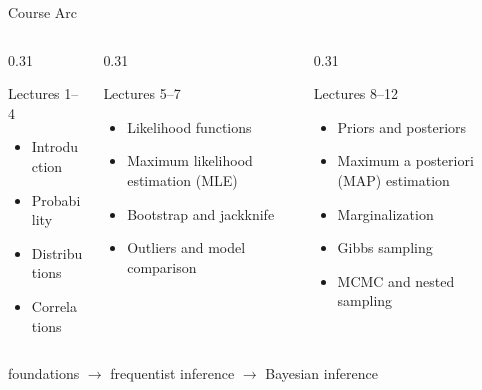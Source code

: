 \documentclass[aspectratio=169,11pt]{beamer}
\begin{document}
\begin{frame}{Course Arc}
  \begin{columns}[T,totalwidth=\textwidth]
    \begin{column}{0.31\textwidth}
      \begin{block}{Lectures 1--4}
        \begin{itemize}
          \item Introduction
          \item Probability
          \item Distributions
          \item Correlations
        \end{itemize}
      \end{block}
    \end{column}
    \begin{column}{0.31\textwidth}
      \begin{block}{Lectures 5--7}
        \begin{itemize}
          \item Likelihood functions
          \item Maximum likelihood estimation (MLE)
          \item Bootstrap and jackknife
          \item Outliers and model comparison
        \end{itemize}
      \end{block}
    \end{column}
    \begin{column}{0.31\textwidth}
      \begin{block}{Lectures 8--12}
        \begin{itemize}
          \item Priors and posteriors
          \item Maximum a posteriori (MAP) estimation
          \item Marginalization
          \item Gibbs sampling
          \item MCMC and nested sampling
        \end{itemize}
      \end{block}
    \end{column}
  \end{columns}
  \vspace{0.35cm}
  \centering
  \large foundations $\rightarrow$ frequentist inference $\rightarrow$ Bayesian inference
\end{frame}
\end{document}
